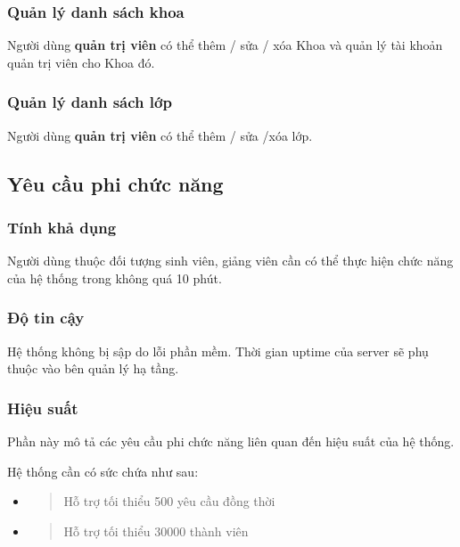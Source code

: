 \documentclass[./../main.tex]{subfiles}
\begin{document}
  \hypertarget{quux1ea3n-luxfd-danh-suxe1ch-khoa}{%
  \subsubsection{Quản lý danh sách
  khoa}\label{quux1ea3n-luxfd-danh-suxe1ch-khoa}}
  
  Người dùng \textbf{quản trị viên} có thể thêm / sửa / xóa Khoa và quản
  lý tài khoản quản trị viên cho Khoa đó.
  
  \hypertarget{quux1ea3n-luxfd-danh-suxe1ch-lux1edbp}{%
  \subsubsection{Quản lý danh sách
  lớp}\label{quux1ea3n-luxfd-danh-suxe1ch-lux1edbp}}
  
  Người dùng \textbf{quản trị viên} có thể thêm / sửa /xóa lớp.

\subsection{Yêu cầu phi chức năng}

\hypertarget{tuxednh-khux1ea3-dux1ee5ng}{%
\subsubsection{Tính khả dụng}\label{tuxednh-khux1ea3-dux1ee5ng}}

Người dùng thuộc đối tượng sinh viên, giảng viên cần có thể thực hiện
chức năng của hệ thống trong không quá 10 phút.

\hypertarget{ux111ux1ed9-tin-cux1eady}{%
\subsubsection{Độ tin cậy}\label{ux111ux1ed9-tin-cux1eady}}

Hệ thống không bị sập do lỗi phần mềm. Thời gian uptime của server sẽ
phụ thuộc vào bên quản lý hạ tầng.

\hypertarget{hiux1ec7u-suux1ea5t}{%
\subsubsection{Hiệu suất}\label{hiux1ec7u-suux1ea5t}}

Phần này mô tả các yêu cầu phi chức năng liên quan đến hiệu suất của hệ
thống.

Hệ thống cần có sức chứa như sau:

\begin{itemize}
\item
  \begin{quote}
  Hỗ trợ tối thiểu 500 yêu cầu đồng thời
  \end{quote}
\item
  \begin{quote}
  Hỗ trợ tối thiểu 30000 thành viên
  \end{quote}
\end{itemize}
\end{document}
